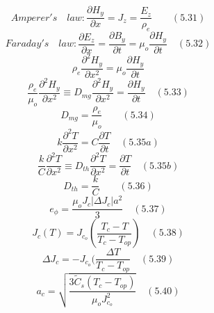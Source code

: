\begin{equation}%
Amperer's\quad law:\frac{\partial H_{y}}{\partial x}=J_{z}=\frac{E_{z}}{\rho_{e}}\qquad(5.31)
\end{equation}
\begin{equation}%
Faraday's\quad law:\frac{\partial E_{z}}{\partial x}=\frac{\partial B_{y}}{\partial t}=\mu_{o}\frac{\partial H_{y}}{\partial t}\quad(5.32)
\end{equation}
\begin{equation}%
\rho_{e}\frac{\partial^{2}H_{y}}{\partial x^{2}}=\mu_{o}\frac{\partial H_{y}}{\partial t}
\end{equation}
\begin{equation}%
\frac{\rho_{e}}{\mu_{o}}\frac{\partial^{2}H_{y}}{\partial x^{2}}\equiv D_{mg}\frac{\partial^{2}H_{y}}{\partial x^{2}}=\frac{\partial H_{y}}{\partial t}\quad(5.33)
\end{equation}
\begin{equation}%
D_{mg}=\frac{{\rho}_{e}}{\mu_{o}}\qquad(5.34)
\end{equation}
\begin{equation}%
k\frac{\partial^{2}T}{\partial x^{2}}=C\frac{\partial T}{\partial t}\quad(5.35a)
\end{equation}
\begin{equation}%
\frac{k}{C}\frac{\partial^{2}T}{\partial x^{2}}\equiv D_{th}\frac{\partial^{2}T}{\partial x^{2}}=\frac{\partial T}{\partial t}\quad(5.35b)
\end{equation}
\begin{equation}%
D_{th}=\frac{k}{C}\qquad(5.36)
\end{equation}
\begin{equation}%
e_{\phi}=\frac{\mu_{o}J_{c}|\Delta J_{c}|a^{2}}{3}\quad(5.37)
\end{equation}
\begin{equation}%
J_{c}(T)=J_{c_{o}}(\frac{T_{c}-T}{T_{c}-T_{op}})\quad(5.38)
\end{equation}
\begin{equation}%
\Delta J_{c}=-J_{c_{o}}(\frac{\Delta T}{T_{c}-T_{op}}\quad(5.39)
\end{equation}
\begin{equation}%
a_{c}=\sqrt{\frac{3\tilde{C}_{s}(T_{c}-T_{op})}{\mu_{o}J_{c_{o}}^{2}}}\quad(5.40)
\end{equation}


